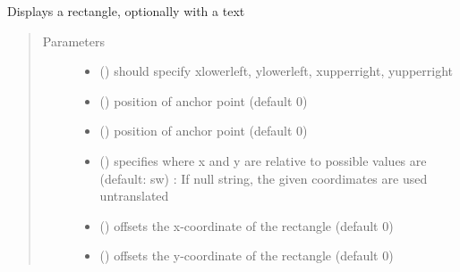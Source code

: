 \documentclass[letterpaper,10pt,english]{sphinxmanual}
\begin{document}
\begin{fulllineitems}
\label{\detokenize{Reference:salabim.AnimateRectangle}}
Displays a rectangle, optionally with a text
\begin{quote}\begin{description}
\item[{Parameters}] \leavevmode\begin{itemize}
\item {} 
 () \textendash{} should specify xlowerleft, ylowerleft, xupperright, yupperright

\item {} 
 () \textendash{} position of anchor point (default 0)

\item {} 
 () \textendash{} position of anchor point (default 0)

\item {} 
 () \textendash{} specifies where x and y are relative to 
possible values are (default: sw) : 
If null string, the given coordimates are used untranslated

\item {} 
 () \textendash{} offsets the x-coordinate of the rectangle (default 0)

\item {} 
 () \textendash{} offsets the y-coordinate of the rectangle (default 0)


\end{itemize}
\end{description}
\end{quote}
\end{fulllineitems}
\end{document}
